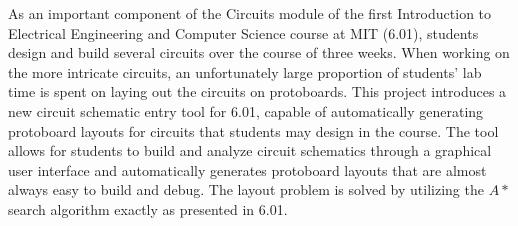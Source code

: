 % 
% 
%

As an important component of the Circuits module of the first Introduction to
Electrical Engineering and Computer Science course at MIT (6.01), students
design and
build several circuits over the course of three weeks. When working on the
more intricate circuits, an unfortunately large proportion of students' lab time
is spent on laying out the circuits on protoboards. This project introduces a
new circuit schematic entry tool for 6.01, capable of automatically generating
protoboard layouts for circuits that students may design in the course. The tool
allows for students to build and analyze circuit schematics through a
graphical user interface and automatically generates protoboard layouts that
are almost always easy to build and debug.
The layout problem is solved by utilizing the $A*$ search algorithm exactly as
presented in 6.01.
